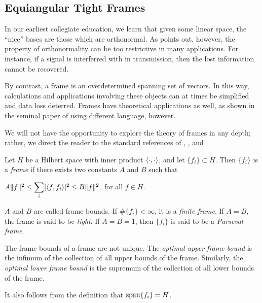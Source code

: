 \documentclass[../../../main]{subfiles}
\begin{document}
\subsection{Equiangular Tight Frames}

In our earliest collegiate education, we learn that given some linear space, the ``nice'' bases are those which are orthonormal. As \cite{undergrad-frames} points out, however, the property of orthonormality can be too restrictive in many applications. For instance, if a signal is interferred with in transmission, then the lost information cannot be recovered. 

By contrast, a frame is an overdetermined %
spanning set of vectors. In this way, calculations and applications involving these objects can at times be simplified and data loss deterred. Frames have theoretical applications as well, as shown in the seminal paper of \cite{paley-wiener} using different language, however.

We will not have the opportunity to explore the theory of frames in any depth; rather, we direct the reader to the standard references of \cite{intro-to-frame-theory}, \cite{waldron-tight-frames}, and \cite{young-nonharmonic-frames}.

\begin{defin}
 Let $H$ be a Hilbert space  with inner product $\langle\cdot,\cdot\rangle$, and let $\{f_i\} \subset H$. Then $\{f_i\}$ is a {\it frame} if there exists two constants $A$ and $B$ such that
 \begin{defenum}
  \item $A\Vert f \Vert^2 \leq \ssum_i \abs{\sharps{f,f_i}}^2 \leq B\Vert f \Vert^2$, for all $f \in H$.
 \end{defenum}
 $A$ and $B$ are called frame bounds. If $\#\{f_i\} < \infty$, it is a {\it finite frame}. If $A=B$, the frame is said to be {\it tight}. If $A=B=1$, then $\{f_i\}$ is said to be a {\it Parseval frame}.
\end{defin}

The frame bounds of a frame are not unique. The {\it optimal upper frame bound} is the infimum of the collection of all upper bounds of the frame. Similarly, the {\it optimal lower frame bound} is the supremum of the collection of all lower bounds of the frame.

It also follows from the definition that $\overline{\text{span}}\{f_i\}=H$.
\end{document}
